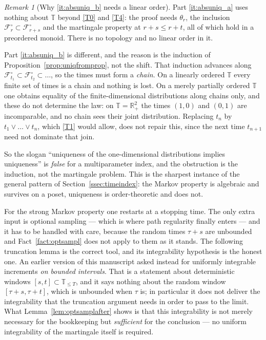 \documentclass[11pt,a4paper]{article}
\theoremstyle{plain}
\theoremstyle{definition}
\theoremstyle{remark}
\newtheorem{remark}[theorem]{Remark}
\newcommand{\R}{\mathbb{R}}
\newcommand{\Rp}{\R_+}
\newcommand{\T}{\mathbb{T}}                     %
\newcommand{\Filt}{\mathcal{F}}
\begin{document}
\begin{remark}[Why \ref{it:absuniq_b} needs a linear order]
  \label{rem:chainonly}
  Part \ref{it:absuniq_a} uses nothing about $\T$ beyond \eqref{T0} and \eqref{T4}: the
  proof needs $\theta_r$, the inclusion $\Filt^\circ_r \subset \Filt^\circ_{r+s}$
  and the martingale property at $r+s \leq r+t$, all of which hold in a
  preordered monoid.  There is no topology and no linear order in it.

  Part \ref{it:absuniq_b} is different, and the reason is the induction of
  Proposition~\ref{prop:uniqfromprop}, not the shift.  That induction advances
  along $\Filt^\circ_{t_1} \subset \Filt^\circ_{t_2} \subset \dots$, so the times
  must form a \emph{chain}.  On a linearly ordered $\T$ every finite set of times
  is a chain and nothing is lost.  On a merely partially ordered $\T$ one obtains
  equality of the finite-dimensional distributions along chains only, and these
  do not determine the law: on $\T = \Rp^2$ the times $(1,0)$ and $(0,1)$ are
  incomparable, and no chain sees their joint distribution.  Replacing $t_n$ by
  $t_1 \vee \dots \vee t_n$, which \eqref{T1} would allow, does not repair this, since
  the next time $t_{n+1}$ need not dominate that join.

  So the slogan ``uniqueness of the one-dimensional distributions implies
  uniqueness'' is \emph{false} for a multiparameter index, and the obstruction is
  the induction, not the martingale problem.  This is the sharpest instance of
  the general pattern of Section~\ref{ssec:timeindex}: the Markov property is
  algebraic and survives on a poset, uniqueness is order-theoretic and does not.
\end{remark}

For the strong Markov property one restarts at a stopping time.  The only extra
input is optional sampling --- which is where path regularity finally enters ---
and it has to be handled with care, because the random times $\tau + s$ are
unbounded and Fact~\ref{fact:optsampl} does not apply to them as it stands.  The
following truncation lemma is the correct tool, and its integrability hypothesis
is the honest one.  An earlier version of this manuscript asked instead for
uniformly integrable increments \emph{on bounded intervals}.  That is a
statement about deterministic windows $[s,t] \subset \T_{\leq T}$, and it says
nothing about the random window $[\tau+s, \tau+t]$, which is unbounded when
$\tau$ is; in particular it does not deliver the integrability that the
truncation argument needs in order to pass to the limit.  What
Lemma~\ref{lem:optsamplafter} shows is that this integrability is not merely
necessary for the bookkeeping but \emph{sufficient} for the conclusion --- no
uniform integrability of the martingale itself is required.
\end{document}
